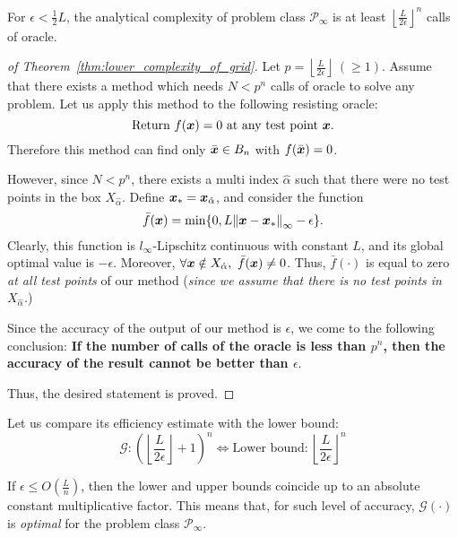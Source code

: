 \begin{thm}\label{thm:lower_complexity_of_grid}
    For \(\epsilon < \frac{1}{2}L\), the analytical complexity of problem class \(\mathscr{P}_\infty\) is at least \(\left\lfloor \frac{L}{2\epsilon} \right\rfloor^n\) calls of oracle.
\end{thm}

\begin{proof}[of Theorem~\ref{thm:lower_complexity_of_grid}]
    Let \(p = \left\lfloor \frac{L}{2\epsilon} \right\rfloor~(\ge 1)\). Assume that there exists a method which needs \(N < p^n\) calls of oracle to solve any problem. Let us apply this method to the following resisting oracle:
    \[
        \text{Return} ~ f(\boldsymbol{x}) = 0 ~ \text{at any test point} ~  \boldsymbol{x}.
    \]
    Therefore this method can find only \(\bar{\boldsymbol{x}} \in B_n\) with \(f(\bar{\boldsymbol{x}}) = 0\).

    However, since \(N < p^n\), there exists a multi index \(\hat{\alpha}\) such that there were no test points in the box \(X_{\hat{\alpha}}\). Define \(\boldsymbol{x}_* = \boldsymbol{x}_{\hat{\alpha}}\), and consider the function
    \[
        \bar{f}(\boldsymbol{x}) = \min \{ 0, L\norm{\boldsymbol{x} - \boldsymbol{x}_*}_{\infty} - \epsilon \}.  
    \]
    Clearly, this function is \(l_\infty\)-Lipschitz continuous with constant \(L\), and its global optimal value is \(-\epsilon\).
    Moreover, \(\forall \boldsymbol{x} \notin X_{\hat{\alpha}},~\bar{f}(\boldsymbol{x}) \ne 0\). Thus, \(\bar{f}(\cdot)\) is equal to zero \emph{at all test points} of our 
    method (\emph{since we assume that there is no test points in \(X_{\hat{\alpha}}\).})

    Since the accuracy of the output of our method is \(\epsilon\), we come to the following conclusion: \textbf{If the number of calls of the oracle is less than \(p^n\), then the accuracy of the result cannot be better than \(\epsilon\)}.

    Thus, the desired statement is proved.
\end{proof}

\begin{thm}\label{thm:upper_lower_bounds}
    Let us compare its efficiency estimate with the lower bound:
    \[
        \mathscr{G}: \left(\left\lfloor \frac{L}{2\epsilon} \right\rfloor + 1\right)^n \Leftrightarrow \text{Lower bound:}~\left\lfloor \frac{L}{2\epsilon} \right\rfloor^n
    \]

    If \(\epsilon \le O\left( \frac{L}{n} \right)\), then the lower and upper bounds coincide up to an absolute constant multiplicative factor. This means that, for such level of accuracy,
    \(\mathscr{G}(\cdot)\) is \emph{optimal} for the problem class \(\mathscr{P}_\infty\).
\end{thm}

